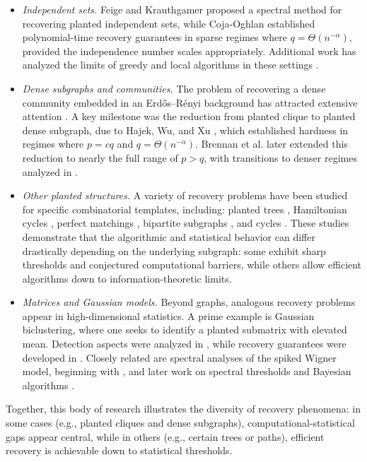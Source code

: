 \documentclass[12pt]{article}
\begin{document}
\begin{itemize}[leftmargin=*]
    \item \emph{Independent sets.} Feige and Krauthgamer \cite{feige2005finding} proposed a spectral method for recovering planted independent sets, while Coja-Oghlan \cite{coja2003finding} established polynomial-time recovery guarantees in sparse regimes where $q = \Theta(n^{-\alpha})$, provided the independence number scales appropriately. Additional work has analyzed the limits of greedy and local algorithms in these settings \cite{coja2015independent, gamarnik2014limits, rahman2017local}.
    \item \emph{Dense subgraphs and communities.} The problem of recovering a dense community embedded in an Erd\H{o}s--R\'enyi background has attracted extensive attention \cite{arias2014community, butucea2013detection, verzelen2015community, Hajek2015, montanari2015finding, candogan2018finding, hajek2016information, chen2016statistical}. A key milestone was the reduction from planted clique to planted dense subgraph, due to Hajek, Wu, and Xu \cite{hajek2015computational}, which established hardness in regimes where $p = cq$ and $q = \Theta(n^{-\alpha})$. Brennan et al. \cite{brennan18a} later extended this reduction to nearly the full range of $p > q$, with transitions to denser regimes analyzed in \cite{bhaskara2010detecting}.
    \item \emph{Other planted structures.} A variety of recovery problems have been studied for specific combinatorial templates, including: planted trees \cite{massoulie19a}, Hamiltonian cycles \cite{Bagaria20}, perfect matchings \cite{10.1214/20-AAP1660}, bipartite subgraphs \cite{HuleihelBip}, and cycles \cite{ChengWein, pmlr-v195-mao23a}. These studies demonstrate that the algorithmic and statistical behavior can differ drastically depending on the underlying subgraph: some exhibit sharp thresholds and conjectured computational barriers, while others allow efficient algorithms down to information-theoretic limits.
    \item \emph{Matrices and Gaussian models.} Beyond graphs, analogous recovery problems appear in high-dimensional statistics. A prime example is Gaussian biclustering, where one seeks to identify a planted submatrix with elevated mean. Detection aspects were analyzed in \cite{butucea2013detection, ma2015computational, montanari2015limitation}, while recovery guarantees were developed in \cite{shabalin2009finding, kolar2011minimax, balakrishnan2011statistical, cai2015computational, chen2016statistical, hajek2016information, brennan19, 10447320, 10387722}. Closely related are spectral analyses of the spiked Wigner model, beginning with \cite{peche2006largest, feral2007largest, capitaine2009largest}, and later work on spectral thresholds and Bayesian algorithms \cite{montanari2015limitation, perry2016statistical, perry2016optimality, banks2018information, hopkins2017power}.
\end{itemize}
Together, this body of research illustrates the diversity of recovery phenomena: in some cases (e.g., planted cliques and dense subgraphs), computational-statistical gaps appear central, while in others (e.g., certain trees or paths), efficient recovery is achievable down to statistical thresholds.
\end{document}
